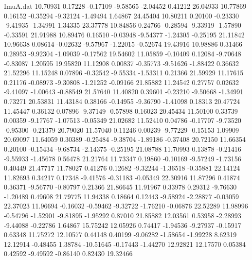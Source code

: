 \begin{filecontents}{ImuA.dat}
  10.70931    0.17228   -0.17109   -9.58565   -2.04452    0.41212   26.04933
  10.77869    0.16152   -0.35294   -9.32124   -1.49494    1.64867   24.45404
  10.80211    0.20100   -0.23330   -9.41935   -1.34991    1.34335   23.37778
  10.84856    0.24766   -0.28594   -9.33919   -1.57890   -0.33591   21.91988
  10.89476    0.16510   -0.03948   -9.54377   -1.24305   -0.25195   21.11842
  10.96638    0.08614   -0.02632   -9.57967   -1.22015   -0.52674   19.43916
  10.98886    0.31466    0.28953   -9.92304   -1.09039   -0.17562   19.54602
  11.05859   -0.10409    0.12084   -9.70648   -0.83087    1.20595   19.95820
  11.12908    0.00837   -0.35773   -9.51626   -1.88422    0.36632   21.52296
  11.15248    0.07896   -0.32542   -9.55334   -1.53311    0.21366   21.59929
  11.17615    0.21176   -0.08973   -9.30808   -1.21252   -0.09166   21.85882
  11.24542    0.27757    0.02632   -9.41097   -1.00643   -0.88549   21.57640
  11.40820    0.39601   -0.23210   -9.50668   -1.34991    0.73271   20.53831
  11.43184    0.38166   -0.14955   -9.36790   -1.41098    0.18313   20.47724
  11.45447    0.36132    0.07896   -9.37149   -0.57898    0.16023   20.45434
  11.50100    0.33739    0.00359   -9.17767   -1.07513   -0.05349   21.02682
  11.52410    0.04786   -0.17707   -9.73520   -0.95300   -0.21379   20.79020
  11.57040    0.11246    0.00239   -9.77229   -0.15153    1.09909   20.69097
  11.64059    0.30389   -0.25484   -9.38704   -1.89186   -0.37408   20.72150
  11.66354    0.20100   -0.15434   -9.68734   -2.14375   -0.25195   21.08788
  11.70993    0.13878   -0.21416   -9.55933   -1.45678    0.56478   21.21764
  11.73347    0.19860   -0.10169   -9.57249   -1.73156    0.40449   21.47717
  11.78027    0.41276    0.12682   -9.32244   -1.36518   -0.35881   22.14124
  11.82693    0.34217    0.17348   -9.41576   -0.31183   -0.05349   22.30916
  11.87296    0.41874    0.36371   -9.56770   -0.80797    0.21366   21.86645
  11.91967    0.33978    0.29312   -9.76630   -1.20489    0.49608   21.79775
  11.94338    0.18664    0.12443   -9.58924   -2.28877   -0.03059   22.37023
  11.96694   -0.16032   -0.59462   -9.32722   -1.76210   -0.06876   22.52289
  11.98996   -0.54796   -1.52901   -9.81895   -1.95292    0.87010   21.85882
  12.03561    0.53958   -2.28993   -9.44088   -0.22786    1.64867   15.75242
  12.05926    0.74417   -1.94536   -9.27937   -0.15917    0.63348   11.75272
  12.10577    0.44148    0.40199   -9.06282   -1.58654   -1.99228    8.62319
  12.12914   -0.48455    1.38784  -10.51645   -0.17443   -1.44270   12.92821
  12.17570    0.05384    0.42592   -9.49592   -0.86140    0.82430   19.32466

\end{filecontents}
